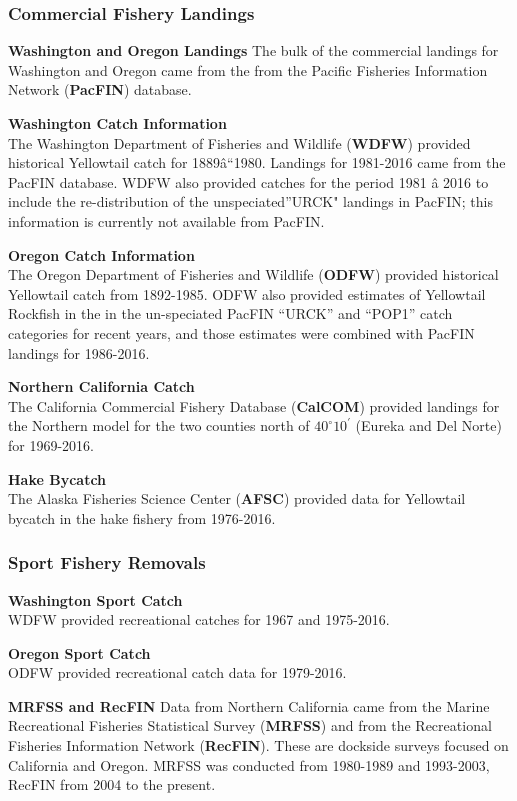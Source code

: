 \documentclass[12pt,]{article}
\begin{document}
\subsubsection{Commercial Fishery
Landings}\label{commercial-fishery-landings}

\textbf{Washington and Oregon Landings} The bulk of the commercial
landings for Washington and Oregon came from the from the Pacific
Fisheries Information Network (\textbf{PacFIN}) database.

\textbf{Washington Catch Information}\\
The Washington Department of Fisheries and Wildlife (\textbf{WDFW})
provided historical Yellowtail catch for 1889â``1980. Landings for
1981-2016 came from the PacFIN database. WDFW also provided catches for
the period 1981 â 2016 to include the re-distribution of the
unspeciated''URCK" landings in PacFIN; this information is currently not
available from PacFIN.

\textbf{Oregon Catch Information}\\
The Oregon Department of Fisheries and Wildlife (\textbf{ODFW}) provided
historical Yellowtail catch from 1892-1985. ODFW also provided estimates
of Yellowtail Rockfish in the in the un-speciated PacFIN ``URCK'' and
``POP1'' catch categories for recent years, and those estimates were
combined with PacFIN landings for 1986-2016.

\textbf{Northern California Catch}\\
The California Commercial Fishery Database (\textbf{CalCOM}) provided
landings for the Northern model for the two counties north of
\(40^\circ 10^\prime\) (Eureka and Del Norte) for 1969-2016.

\textbf{Hake Bycatch}\\
The Alaska Fisheries Science Center (\textbf{AFSC}) provided data for
Yellowtail bycatch in the hake fishery from 1976-2016.

\subsubsection{Sport Fishery Removals}\label{sport-fishery-removals}

\textbf{Washington Sport Catch}\\
WDFW provided recreational catches for 1967 and 1975-2016.

\textbf{Oregon Sport Catch}\\
ODFW provided recreational catch data for 1979-2016.

\textbf{MRFSS and RecFIN} Data from Northern California came from the
Marine Recreational Fisheries Statistical Survey (\textbf{MRFSS}) and
from the Recreational Fisheries Information Network (\textbf{RecFIN}).
These are dockside surveys focused on California and Oregon. MRFSS was
conducted from 1980-1989 and 1993-2003, RecFIN from 2004 to the present.
\end{document}
